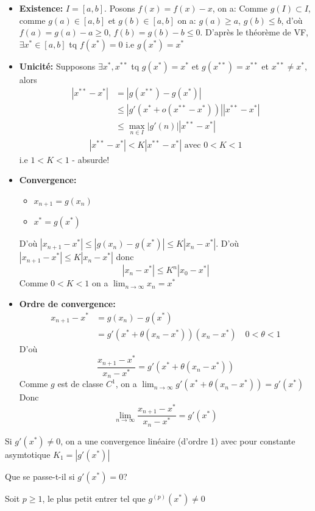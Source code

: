 \begin{preuve}
   \begin{itemize}
       \item \textbf{Existence:} $I = [a, b]$. Posons  $f(x) = f(x) - x$, on a: Comme  $g(I) \subset I$, comme $g(a) \in [a, b]$ et $g(b) \in [a, b]$ on a: $g(a) \ge a$, $g(b) \le b$, d'où $f(a) = g(a) - a \ge 0$, $f(b) = g(b) - b \le 0$. D'après le théorème de VF, $\exists x^* \in [a, b]$ tq $f(x^*) = 0$ i.e  $g(x^*) = x^*$ 
       \item \textbf{Unicité:} Supposons $\exists x^*, x^{**}$ tq $g(x^*) = x^*$ et  $g(x^{* *}) = x^{* *}$ et  $x^{* *} \neq x^*$, alors 
           \begin{align*}
               |x^{* *} - x^*| &= |g(x^{* *}) - g(x^*)| \\
                               &\le |g'(x^* + o(x^{* *} - x^*))| |x^{* *} - x^*|\\
                               &\le \max_{n \in I} |g'(n)| |x^{* *} - x^*|
           \end{align*}
           \begin{align*}
               |x^{* *} - x^*| < K |x^{* *} - x^{*}| \text{ avec } 0 < K < 1
           \end{align*}
           i.e $1 < K < 1$ - absurde! 
        \item \textbf{Convergence:}
            \begin{itemize}
                \item $x_{n+1} = g(x_n)$
                \item $x^* = g(x^*)$
            \end{itemize}
            D'où $|x_{n+1} - x^*| \le |g(x_n) - g(x^*)| \le K |x_n - x^*|$. D'où $|x_{n+1} - x^*| \le K|x_n - x^*|$ donc
            \[
            |x_n - x^*| \le K^n |x_0 - x^*|
            \] 
            Comme $0 < K < 1$ on a  $\lim_{n \to \infty} x_n = x^*$ 
        \item \textbf{Ordre de convergence:} 
            \begin{align*}
                x_{n+1} - x^* &= g(x_n) - g(x^*)\\
                              &= g'(x^* + \theta(x_n - x^*))(x_n - x^*) \quad 0 < \theta < 1
            \end{align*}
            D'où  
            \[
            \frac{x_{n+1} - x^*}{x_n - x^*} = g'(x^* + \theta(x_n - x^*))
            \] 
            Comme $g$ est de classe  $C^1$, on a  $\lim_{n \to \infty} g'(x^* + \theta(x_n - x^*)) = g'(x^*)$
            Donc  
            \[
            \lim_{n \to \infty} \frac{x_{n+1} - x^*}{x_n - x^*} = g'(x^*)
            \] 
   \end{itemize} 
\end{preuve}
\begin{remark}
   Si $g'(x^*) \neq 0$, on a une convergence linéaire (d'ordre 1) avec pour constante asymtotique $K_1 = |g'(x^*)|$ \par 
\end{remark}
Que se passe-t-il si $g'(x^*) = 0$? \par
Soit  $p \ge 1$, le plus petit entrer tel que $g^{(p)}(x^*) \neq 0$

